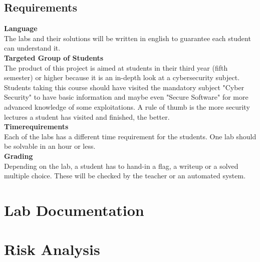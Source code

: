 \subsection{Requirements}
\textbf{Language} \\
The labs and their solutions will be written in english to guarantee each student can understand it. \\[0.5cm]
\textbf{Targeted Group of Students} \\
The product of this project is aimed at students in their third year (fifth semester) or higher because it is an in-depth look at a cybersecurity subject. Students taking this course should have visited the mandatory subject "Cyber Security" to have basic information and maybe even "Secure Software" for more advanced knowledge of some exploitations. A rule of thumb is the more security lectures a student has visited and finished, the better. \\[0.5cm]
\textbf{Timerequirements} \\
Each of the labs has a different time requirement for the students. One lab should be solvable in an hour or less.  \\[0.5cm]
\textbf{Grading} \\
Depending on the lab, a student has to hand-in a flag, a writeup or a solved multiple choice. These will be checked by the teacher or an automated system. \\[0.5cm]

\newpage
\section{Lab Documentation}


\section{Risk Analysis}

